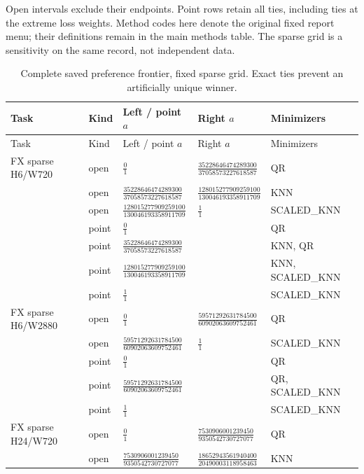 \documentclass[11pt,a4paper]{article}
\begin{document}
Open intervals exclude their endpoints. Point rows retain all
ties, including ties at the extreme loss weights. Method codes here denote
the original fixed report menu; their definitions remain in the main methods
table. The sparse grid is a sensitivity on the same record, not independent
data.\begingroup
\scriptsize
\setlength{\tabcolsep}{3pt}
\renewcommand{\arraystretch}{1.12}
\begin{longtable}{p{28mm}p{10mm}p{39mm}p{39mm}p{28mm}}
\caption{Complete saved preference frontier, fixed sparse grid. Exact ties prevent an artificially unique winner.}\\
\toprule
Task & Kind & Left / point \(a\) & Right \(a\) & Minimizers \\
\midrule
\endfirsthead
\toprule
Task & Kind & Left / point \(a\) & Right \(a\) & Minimizers \\
\midrule
\endhead
\bottomrule
\endfoot
FX sparse H6/W720 & open & \(\frac{0}{1}\) & \(\frac{35228646474289300}{37058573227618587}\) & QR \\
 & open & \(\frac{35228646474289300}{37058573227618587}\) & \(\frac{128015277909259100}{130046193358911709}\) & KNN \\
 & open & \(\frac{128015277909259100}{130046193358911709}\) & \(\frac{1}{1}\) & SCALED\_KNN \\
 & point & \(\frac{0}{1}\) &  & QR \\
 & point & \(\frac{35228646474289300}{37058573227618587}\) &  & KNN, QR \\
 & point & \(\frac{128015277909259100}{130046193358911709}\) &  & KNN, SCALED\_KNN \\
 & point & \(\frac{1}{1}\) &  & SCALED\_KNN \\
FX sparse H6/W2880 & open & \(\frac{0}{1}\) & \(\frac{59571292631784500}{60902063609752461}\) & QR \\
 & open & \(\frac{59571292631784500}{60902063609752461}\) & \(\frac{1}{1}\) & SCALED\_KNN \\
 & point & \(\frac{0}{1}\) &  & QR \\
 & point & \(\frac{59571292631784500}{60902063609752461}\) &  & QR, SCALED\_KNN \\
 & point & \(\frac{1}{1}\) &  & SCALED\_KNN \\
FX sparse H24/W720 & open & \(\frac{0}{1}\) & \(\frac{7530906001239450}{9350542730727077}\) & QR \\
 & open & \(\frac{7530906001239450}{9350542730727077}\) & \(\frac{18652943561940400}{20490003118958463}\) & KNN \\

\end{longtable}
\end{document}
